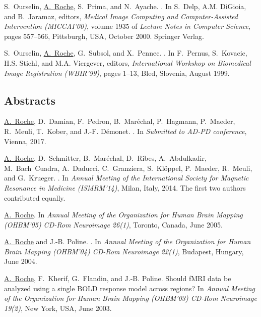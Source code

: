 \begin{thebibliography}{100}
S.~Ourselin, \underline{A.~Roche}, S.~Prima, and N.~Ayache.
.
\newblock In S.~Delp, A.M. DiGioia, and B.~Jaramaz, editors, {\em Medical Image
  Computing and Computer-Assisted Intervention (MICCAI'00)}, volume 1935 of
  {\em Lecture Notes in Computer Science}, pages 557--566, Pittsburgh, USA,
  October 2000. Springer Verlag.

S.~Ourselin, \underline{A.~Roche}, G.~Subsol, and X.~Pennec.
.
\newblock In F.~Pernus, S.~Kovacic, H.S. Stiehl, and M.A. Viergever, editors,
  {\em International Workshop on Biomedical Image Registration (WBIR'99)},
  pages 1--13, Bled, Slovenia, August 1999.


\subsection*{Abstracts}

\underline{A.~Roche}, D.~Damian, F.~Pedron, B.~Mar\'echal, P.~Hagmann, P.~Maeder, R.~Meuli,
  T.~Kober, and J.-F. D\'emonet.
.
\newblock In {\em Submitted to AD-PD conference}, Vienna, 2017.

\underline{A.~Roche}, D.~Schmitter, B.~Mar\'echal, D.~Ribes, A.~Abdulkadir, M.~Bach~Cuadra,
  A.~Daducci, C.~Granziera, S.~Kl\"oppel, P.~Maeder, R.~Meuli, and G.~Krueger.
.
\newblock In {\em Annual Meeting of the International Society for Magnetic
  Resonance in Medicine (ISMRM'14)}, Milan, Italy, 2014.
\newblock The first two authors contributed equally.

\underline{A.~Roche}.
\newblock In {\em Annual Meeting of the Organization for Human Brain Mapping
  (OHBM'05) CD-Rom Neuroimage 26(1)}, Toronto, Canada, June 2005.

\underline{A.~Roche} and J.-B. Poline.
.
\newblock In {\em Annual Meeting of the Organization for Human Brain Mapping
  (OHBM'04) CD-Rom Neuroimage 22(1)}, Budapest, Hungary, June 2004.

\underline{A.~Roche}, F.~Kherif, G.~Flandin, and J.-B. Poline.
\newblock Should {fMRI} data be analyzed using a single {BOLD} response model
  across regions?
\newblock In {\em Annual Meeting of the Organization for Human Brain Mapping
  (OHBM'03) CD-Rom Neuroimage 19(2)}, New York, USA, June 2003.


\end{thebibliography}
